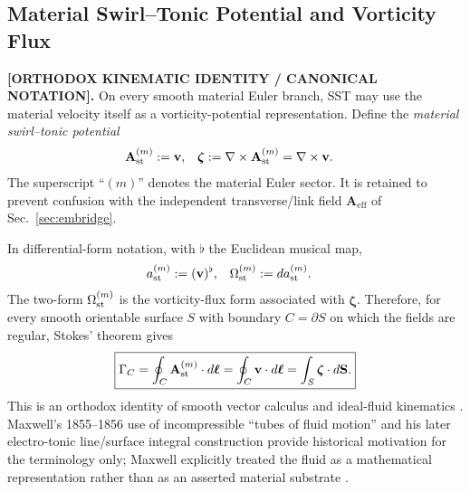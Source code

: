 
\subsection{Material Swirl--Tonic Potential and Vorticity Flux}
    \label{subsec:material_swirl_tonic_potential}

    \textbf{[ORTHODOX KINEMATIC IDENTITY / CANONICAL NOTATION].}
    On every smooth material Euler branch, SST may use the material velocity itself
    as a vorticity-potential representation.  Define the \emph{material swirl--tonic
    potential}
    \begin{align}
        \mathbf A_{\rm st}^{(m)}
        &:= \mathbf v,
        &
        \boldsymbol{\zeta}
        &:= \nabla\times\mathbf A_{\rm st}^{(m)}
        =\nabla\times\mathbf v.
        \label{eq:material_swirl_tonic_definition}
    \end{align}
    The superscript ``$(m)$'' denotes the material Euler sector.  It is retained to
    prevent confusion with the independent transverse/link field
    $\mathbf A_{\mathrm{eff}}$ of Sec.~\ref{sec:embridge}.

    In differential-form notation, with $\flat$ the Euclidean musical map,
    \begin{align}
        a_{\rm st}^{(m)}
        &:=(\mathbf v)^\flat,
        &
        \Omega_{\rm st}^{(m)}
        &:=d a_{\rm st}^{(m)}.
        \label{eq:material_swirl_tonic_forms}
    \end{align}
    The two-form $\Omega_{\rm st}^{(m)}$ is the vorticity-flux form associated with
    $\boldsymbol{\zeta}$.  Therefore, for every smooth orientable surface $S$ with
    boundary $C=\partial S$ on which the fields are regular, Stokes' theorem gives
    \begin{align}
        \boxed{
        \Gamma_C
        =
        \oint_C\mathbf A_{\rm st}^{(m)}\cdot d\boldsymbol\ell
        =
        \oint_C\mathbf v\cdot d\boldsymbol\ell
        =
        \int_S\boldsymbol{\zeta}\cdot d\mathbf S .
        }
        \label{eq:material_swirl_tonic_stokes}
    \end{align}
    This is an orthodox identity of smooth vector calculus and ideal-fluid
    kinematics \cite{MajdaBertozzi2002}.  Maxwell's 1855--1856 use of
    incompressible ``tubes of fluid motion'' and his later electro-tonic line/surface
    integral construction provide historical motivation for the terminology only;
    Maxwell explicitly treated the fluid as a mathematical representation rather
    than as an asserted material substrate \cite{Maxwell1856FaradayLines}.

